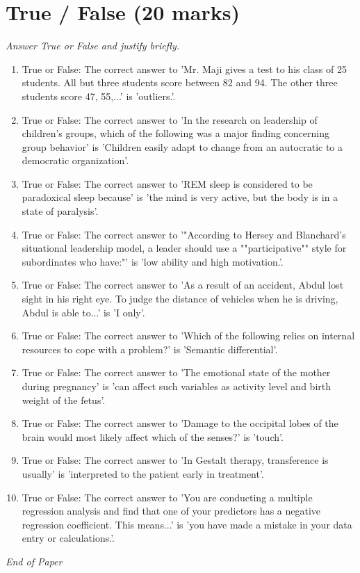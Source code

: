 \documentclass[12pt]{article}
\begin{document}
\section*{True / False (20 marks)}
\textit{Answer True or False and justify briefly.}
\begin{enumerate}[label=\arabic*.]
\item True or False: The correct answer to 'Mr. Maji gives a test to his class of 25 students. All but three students score between 82 and 94. The other three students score 47, 55,...' is 'outliers.'.
\item True or False: The correct answer to 'In the research on leadership of children's groups, which of the following was a major finding concerning group behavior' is 'Children easily adapt to change from an autocratic to a democratic organization'.
\item True or False: The correct answer to 'REM sleep is considered to be paradoxical sleep because' is 'the mind is very active, but the body is in a state of paralysis'.
\item True or False: The correct answer to '"According to Hersey and Blanchard's situational leadership model, a leader should use a ""participative"" style for subordinates who have:"' is 'low ability and high motivation.'.
\item True or False: The correct answer to 'As a result of an accident, Abdul lost sight in his right eye. To judge the distance of vehicles when he is driving, Abdul is able to...' is 'I only'.
\item True or False: The correct answer to 'Which of the following relies on internal resources to cope with a problem?' is 'Semantic differential'.
\item True or False: The correct answer to 'The emotional state of the mother during pregnancy' is 'can affect such variables as activity level and birth weight of the fetus'.
\item True or False: The correct answer to 'Damage to the occipital lobes of the brain would most likely affect which of the senses?' is 'touch'.
\item True or False: The correct answer to 'In Gestalt therapy, transference is usually' is 'interpreted to the patient early in treatment'.
\item True or False: The correct answer to 'You are conducting a multiple regression analysis and find that one of your predictors has a negative regression coefficient. This means...' is 'you have made a mistake in your data entry or calculations.'.
\end{enumerate}

\vfill
\noindent\textit{End of Paper}
\end{document}
